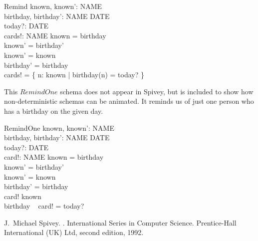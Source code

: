 \documentclass{article}
\begin{document}
\begin{schema}{Remind}
    known, known': \power NAME \\
    birthday, birthday': NAME \pfun DATE \\
    today?: DATE \\
    cards!: \power NAME
\where
    known = \dom birthday \\
    known' = \dom birthday' \\
    known' = known \\
    birthday' = birthday \\
    cards! = \{ n: known | birthday(n) = today? \}
\end{schema}

This $RemindOne$ schema does not appear in Spivey, but is
included to show how non-deterministic schemas can be animated.
It reminds us of just one person who has a birthday on the given 
day.
\begin{schema}{RemindOne}
    known, known': \power NAME \\
    birthday, birthday': NAME \pfun DATE \\
    today?: DATE \\
    card!: NAME
\where
    known = \dom birthday \\
    known' = \dom birthday' \\
    known' = known \\
    birthday' = birthday \\
    card! \in known \\
    birthday ~ card! = today?
\end{schema}


% 

\begin{thebibliography}{1}
J.~Michael Spivey.
.
\newblock International Series in Computer Science. Prentice-Hall International
  (UK) Ltd, second edition, 1992.
\end{thebibliography}
\end{document}
